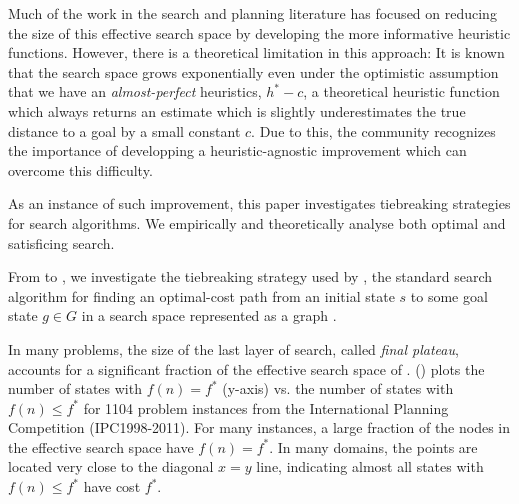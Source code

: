 Much of the work in the search and planning literature has focused on
reducing the size of this effective search space by developing the more
informative heuristic functions. However, there is a theoretical
limitation in this approach: It is known that the search space grows
exponentially \cite{helmert2008good} even under the optimistic
assumption that we have an \emph{almost-perfect} heuristics, $h^*-c$, a
theoretical heuristic function which always returns an estimate which is
slightly underestimates the true distance to a goal by a small constant
$c$. Due to this, the community recognizes the importance of developping
a heuristic-agnostic improvement which can overcome this difficulty.

As an instance of such improvement, this paper investigates tiebreaking
strategies for search algorithms. We empirically and theoretically
analyse both optimal and satisficing search.


From  to , we investigate
the tiebreaking strategy used by \astar, the standard search algorithm
for finding an optimal-cost path from an initial state $s$ to some goal
state $g \in G$ in a search space represented as a graph
\cite{hart1968formal}. 

In many problems, the size of the last layer of search, called
\emph{final plateau}, accounts for a significant fraction of
the effective search space of \astar.  
() plots the
number of states with $f(n) = f^*$ (y-axis) vs. the number of states with
$f(n) \leq f^*$ for 1104 problem instances from the International
Planning Competition (IPC1998-2011).  For many instances, a large
fraction of the nodes in the effective search space have $f(n)=f^*$.
In many domains, the points are located very close to the diagonal $x=y$
line, indicating almost all states with $f(n) \leq f^*$ have cost $f^*$.



